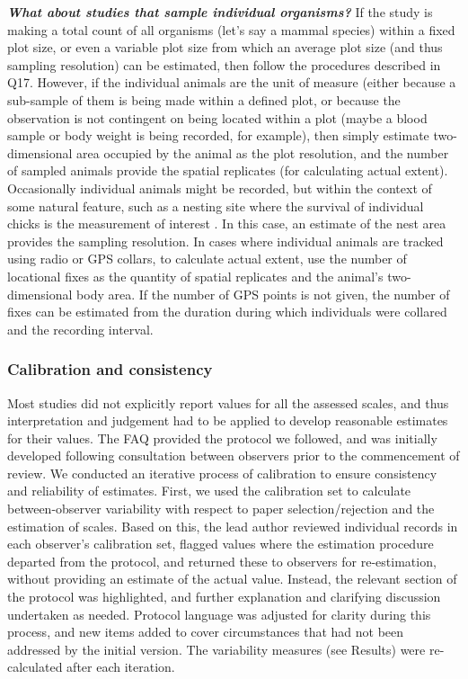 \documentclass[12pt]{article}
\begin{document}
\begin{enumerate}
  \Hitem \emph{\textbf{What about studies that sample individual organisms?}} If the study is making a total count of all organisms (let's say a mammal species) within a fixed plot size, or even a variable plot size from which an average plot size (and thus sampling resolution) can be estimated, then follow the procedures described in Q17. However, if the individual animals are the unit of measure (either because a sub-sample of them is being made within a defined plot, or because the observation is not contingent on being located within a plot (maybe a blood sample or body weight is being recorded, for example), then simply estimate two-dimensional area occupied by the animal as the plot resolution, and the number of sampled animals provide the spatial replicates (for calculating actual extent). Occasionally individual animals might be recorded, but within the context of some natural feature, such as a nesting site where the survival of individual chicks is the measurement of interest \cite{roche_relative_2008}. In this case, an estimate of the nest area provides the sampling resolution. In cases where individual animals are tracked using radio or GPS collars, to calculate actual extent, use the number of locational fixes as the quantity of spatial replicates and the animal's two-dimensional body area. If the number of GPS points is not given, the number of fixes can be estimated from the duration during which individuals were collared and the recording interval.

\end{enumerate}

\subsubsection*{Calibration and consistency}
\vspace{-10pt}
Most studies did not explicitly report values for all the assessed scales, and thus interpretation and judgement had to be applied to develop reasonable estimates for their values. The FAQ provided the protocol we followed, and was initially developed following consultation between observers prior to the commencement of review. We conducted an iterative process of calibration to ensure consistency and reliability of estimates. First, we used the calibration set to calculate between-observer variability with respect to paper selection/rejection and the estimation of scales.  Based on this, the lead author reviewed individual records in each observer's calibration set, flagged values where the estimation procedure departed from the protocol, and returned these to observers for re-estimation, without providing an estimate of the actual value. Instead, the relevant section of the protocol was highlighted, and further explanation and clarifying discussion undertaken as needed. Protocol language was adjusted for clarity during this process, and new items added to cover circumstances that had not been addressed by the initial version. The variability measures (see Results) were re-calculated after each iteration.  
\end{document}
